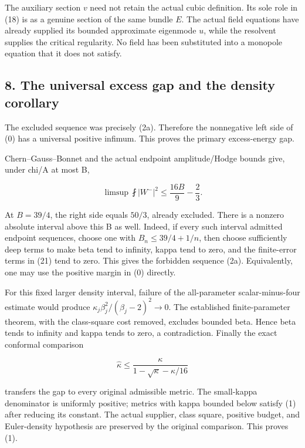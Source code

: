 The auxiliary section \(v\) need not retain the actual cubic definition.
Its sole role in (18) is as a genuine section of the same bundle \(E\).
The actual field equations have already supplied its bounded approximate
eigenmode \(u\), while the resolvent supplies the critical regularity.
No field has been substituted into a monopole equation that it does not
satisfy.

\hypertarget{o10strength:the-universal-excess-gap-and-the-density-corollary}{%
\subsection{8. The universal excess gap and the density
corollary}\label{o10strength:the-universal-excess-gap-and-the-density-corollary}}

The excluded sequence was precisely (2a). Therefore the nonnegative left
side of (0) has a universal positive infimum. This proves the primary
excess-energy gap.

Chern--Gauss--Bonnet and the actual endpoint amplitude/Hodge bounds
give, under chi/A at most B,

\[
 \limsup\fint|W^-|^2\le\frac{16B}{9}-\frac23.
\tag{21}
\]

At \(B=39/4\), the right side equals \(50/3\), already excluded. There
is a nonzero absolute interval above this B as well. Indeed, if every
such interval admitted endpoint sequences, choose one with
\(B_n\le39/4+1/n\), then choose sufficiently deep terms to make beta
tend to infinity, kappa tend to zero, and the finite-error terms in (21)
tend to zero. This gives the forbidden sequence (2a). Equivalently, one
may use the positive margin in (0) directly.

For this fixed larger density interval, failure of the all-parameter
scalar-minus-four estimate would produce
\(\kappa_j\beta_j^2/(\beta_j-2)^2\to0\). The established
finite-parameter theorem, with the class-square cost removed, excludes
bounded beta. Hence beta tends to infinity and kappa tends to zero, a
contradiction. Finally the exact conformal comparison

\[
 \widehat\kappa\le\frac{\kappa}{1-\sqrt\kappa-\kappa/16}
\]

transfers the gap to every original admissible metric. The small-kappa
denominator is uniformly positive; metrics with kappa bounded below
satisfy (1) after reducing its constant. The actual supplier, class
square, positive budget, and Euler-density hypothesis are preserved by
the original comparison. This proves (1).

